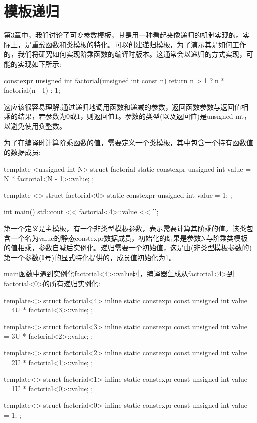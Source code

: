 \section{模板递归}
第3章中，我们讨论了可变参数模板，其是用一种看起来像递归的机制实现的。实际上，是重载函数和类模板的特化。可以创建递归模板，为了演示其是如何工作的，我们将研究如何实现阶乘函数的编译时版本。这通常会以递归的方式实现，可能的实现如下所示:

\begin{cpp}
constexpr unsigned int factorial(unsigned int const n)
{
	return n > 1 ? n * factorial(n - 1) : 1;
}
\end{cpp}

这应该很容易理解:通过递归地调用函数和递减的参数，返回函数参数与返回值相乘的结果，若参数为0或1，则返回值1。参数的类型(以及返回值)是unsigned int，以避免使用负整数。

为了在编译时计算阶乘函数的值，需要定义一个类模板，其中包含一个持有函数值的数据成员:

\begin{cpp}
template <unsigned int N>
struct factorial
{
	static constexpr unsigned int value =
		N * factorial<N - 1>::value;
};

template <>
struct factorial<0>
{
	static constexpr unsigned int value = 1;
};

int main()
{
	std::cout << factorial<4>::value << '\n';
}
\end{cpp}

第一个定义是主模板，有一个非类型模板参数，表示需要计算其阶乘的值。该类包含一个名为value的静态constexpr数据成员，初始化的结果是参数N与阶乘类模板的值相乘，参数自减后实例化。递归需要一个初始值，这是由(非类型模板参数的)第一个参数(0号)的显式特化提供的，成员值初始化为1。

main函数中遇到实例化factorial<4>::value时，编译器生成从factorial<4>到factorial<0>的所有递归实例化:

\begin{cpp}
template<>
struct factorial<4>
{
	inline static constexpr const unsigned int value =
		4U * factorial<3>::value;
};

template<>
struct factorial<3>
{
	inline static constexpr const unsigned int value =
		3U * factorial<2>::value;
};

template<>
struct factorial<2>
{
	inline static constexpr const unsigned int value =
		2U * factorial<1>::value;
};

template<>
struct factorial<1>
{
	inline static constexpr const unsigned int value =
		1U * factorial<0>::value;
};

template<>
struct factorial<0>
{
	inline static constexpr const unsigned int value = 1;
};
\end{cpp}

